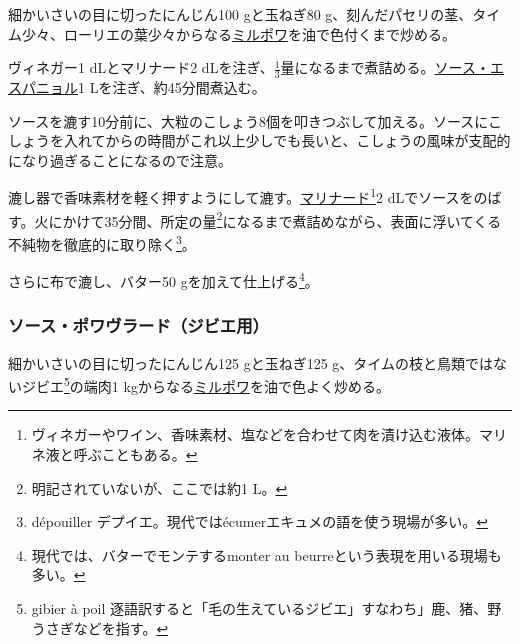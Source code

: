 \begin{recette}


細かいさいの目に切ったにんじん100 gと玉ねぎ80
g、刻んだパセリの茎、タイム少々、ローリエの葉少々からなる\protect\hyperlink{mirepoix}{ミルポワ}を油で色付くまで炒める。

ヴィネガー1 dLとマリナード2
dLを注ぎ、\(\frac{1}{3}\)量になるまで煮詰める。\protect\hyperlink{sauce-espagnole}{ソース・エスパニョル}1
Lを注ぎ、約45分間煮込む。

ソースを漉す10分前に、大粒のこしょう8個を叩きつぶして加える。ソースにこしょうを入れてからの時間がこれ以上少しでも長いと、こしょうの風味が支配的になり過ぎることになるので注意。

漉し器で香味素材を軽く押すようにして漉す。\protect\hyperlink{marinades-et-saumures}{マリナード}\footnote{ヴィネガーやワイン、香味素材、塩などを合わせて肉を漬け込む液体。マリネ液と呼ぶこともある。}2
dLでソースをのばす。火にかけて35分間、所定の量\footnote{明記されていないが、ここでは約1
  L。}になるまで煮詰めながら、表面に浮いてくる不純物を徹底的に取り除く\footnote{dépouiller
  デプイエ。現代ではécumerエキュメの語を使う現場が多い。}。

さらに布で漉し、バター50 gを加えて仕上げる\footnote{現代では、バターでモンテするmonter
  au beurreという表現を用いる現場も多い。}。

\hypertarget{sauce-poivrade-pour-gibier}{%
\subsubsection{ソース・ポワヴラード（ジビエ用）}\label{sauce-poivrade-pour-gibier}}



細かいさいの目に切ったにんじん125 gと玉ねぎ125
g、タイムの枝と鳥類ではないジビエ\footnote{gibier à poil
  逐語訳すると「毛の生えているジビエ」すなわち」鹿、猪、野うさぎなどを指す。}の端肉1
kgからなる\protect\hyperlink{mirepoix}{ミルポワ}を油で色よく炒める。


\end{recette}
